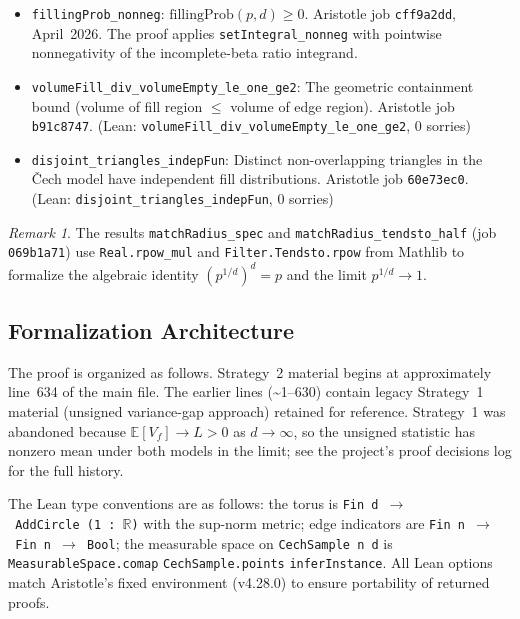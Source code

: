 \documentclass[reqno,12pt]{amsart}
\newcommand{\fillingP}{\mathrm{fillingProb}}
\newcommand{\EE}{\mathbb{E}}
\newcommand{\lean}[1]{\textup{\texttt{\small #1}}}
\newcommand{\leanverified}[1]{\textup{(Lean: \texttt{#1}, 0 sorries)}}
\theoremstyle{plain}
\theoremstyle{definition}
\theoremstyle{remark}
\newtheorem{remark}[theorem]{Remark}
\begin{document}
\begin{itemize}[leftmargin=*, itemsep=4pt]
\item \lean{fillingProb\_nonneg}: $\fillingP(p,d)\geq 0$. Aristotle job \texttt{cff9a2dd},
  April~2026. The proof applies \texttt{setIntegral\_nonneg} with pointwise nonnegativity
  of the incomplete-beta ratio integrand.

\item \lean{volumeFill\_div\_volumeEmpty\_le\_one\_ge2}: The geometric containment bound
  (volume of fill region $\leq$ volume of edge region). Aristotle job \texttt{b91c8747}.
  \leanverified{volumeFill\_div\_volumeEmpty\_le\_one\_ge2}

\item \lean{disjoint\_triangles\_indepFun}: Distinct non-overlapping triangles in the \v{C}ech
  model have independent fill distributions. Aristotle job \texttt{60e73ec0}.
  \leanverified{disjoint\_triangles\_indepFun}
\end{itemize}

\begin{remark}
The results \lean{matchRadius\_spec} and \lean{matchRadius\_tendsto\_half} (job
\texttt{069b1a71}) use \texttt{Real.rpow\_mul} and \texttt{Filter.Tendsto.rpow} from
Mathlib to formalize the algebraic identity $(p^{1/d})^d = p$ and the limit $p^{1/d}\to 1$.
\end{remark}

\subsection{Formalization Architecture}

The proof is organized as follows. Strategy~2 material begins at approximately line~634 of the
main file. The earlier lines (\textasciitilde1--630) contain legacy Strategy~1 material
(unsigned variance-gap approach) retained for reference. Strategy~1 was abandoned because
$\EE[V_f]\to L > 0$ as $d\to\infty$, so the unsigned statistic has nonzero mean under both
models in the limit; see the project's proof decisions log for the full history.

The Lean type conventions are as follows: the torus is
\texttt{Fin~d~$\to$~AddCircle~(1~:~$\mathbb{R}$)} with the sup-norm metric; edge
indicators are \texttt{Fin~n~$\to$~Fin~n~$\to$~Bool}; the measurable space on
\texttt{CechSample n d} is \texttt{MeasurableSpace.comap} \texttt{CechSample.points}
\texttt{inferInstance}. All Lean options match Aristotle's fixed environment (v4.28.0)
to ensure portability of returned proofs.

\end{document}
